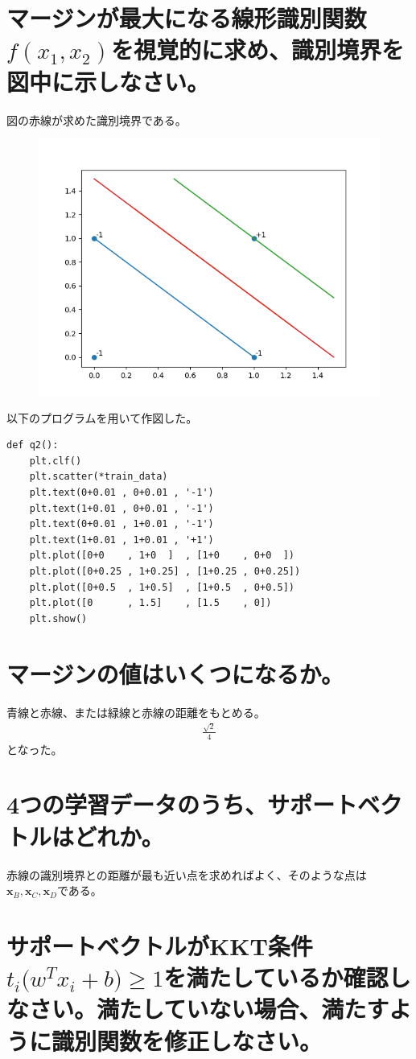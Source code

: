 \documentclass{ltjsarticle}
\begin{document}
\section{マージンが最大になる線形識別関数$f(x_1 , x_2)$を視覚的に求め、識別境界を図中に示しなさい。}
図の赤線が求めた識別境界である。
\begin{figure}[H]
	\centering
	\includegraphics[width=0.5\linewidth]{../images/2_line.png}
	\caption{}
	\label{2_line}
\end{figure}
以下のプログラムを用いて作図した。
\begin{lstlisting}
def q2():
    plt.clf()
    plt.scatter(*train_data)
    plt.text(0+0.01 , 0+0.01 , '-1')
    plt.text(1+0.01 , 0+0.01 , '-1')
    plt.text(0+0.01 , 1+0.01 , '-1')
    plt.text(1+0.01 , 1+0.01 , '+1')
    plt.plot([0+0    , 1+0  ]  , [1+0    , 0+0  ])
    plt.plot([0+0.25 , 1+0.25] , [1+0.25 , 0+0.25])
    plt.plot([0+0.5  , 1+0.5]  , [1+0.5  , 0+0.5])
    plt.plot([0      , 1.5]    , [1.5    , 0])
    plt.show()
\end{lstlisting}


\section{マージンの値はいくつになるか。}
青線と赤線、または緑線と赤線の距離をもとめる。
\begin{align}
	\frac{\sqrt{2}}{4}
\end{align}
となった。

\section{4つの学習データのうち、サポートベクトルはどれか。}
赤線の識別境界との距離が最も近い点を求めればよく、そのような点は$\bm{x}_B,\bm{x}_C,\bm{x}_D$である。

\section{サポートベクトルがKKT条件$ t_i\bigl(w^T x_i + b \bigr) \ge 1 $を満たしているか確認しなさい。満たしていない場合、満たすように識別関数を修正しなさい。}
\end{document}
